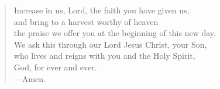\prayer

\setlength{\leftmargini}{\prayerleftmargini}

\begin{verse}
Increase in us, Lord, the faith you have given us,\\
and bring to a harvest worthy of heaven\\
the praise we offer you at the beginning of this new day.\\
We ask this through our Lord Jesus Christ, your Son,\\
who lives and reigns with you and the Holy Spirit,\\
God, for ever and ever.\\
{\color{red}---\thinspace}Amen.
\end{verse}

\setlength{\leftmargini}{\defleftmargini}
